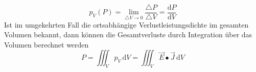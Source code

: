 \begin{equation} 
\boxed{p_V\left(P\right)=\displaystyle \lim_{\triangle V\rightarrow 0}\dfrac{\triangle P}{\triangle V}=\dfrac{\text{d}P}{\text{d}V}}
\end{equation} 
Ist im umgekehrten Fall die ortsabhängige Verlustleistungsdichte im gesamten Volumen bekannt, dann können die Gesamtverluste durch Integration über das Volumen berechnet werden
\begin{equation}
\boxed{P=\displaystyle \iiint_{V}p_V\,\text{d}V=\displaystyle \iiint_{V}\overrightarrow{E}\bullet \overrightarrow{J}\,\text{d}V} 
\end{equation} 
